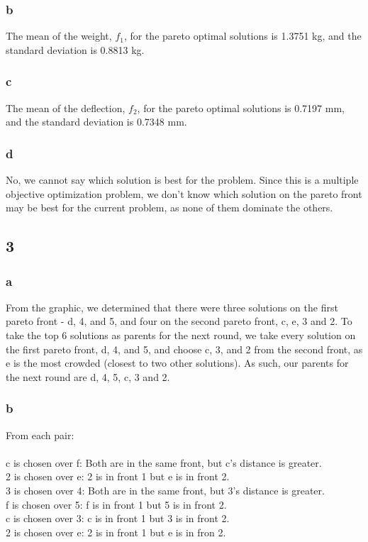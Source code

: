 \documentclass[12pt]{article}
\begin{document}
\subsubsection{b}
The mean of the weight, $f_1$, for the pareto optimal solutions is 1.3751 kg, and the standard deviation is 0.8813 kg.

\subsubsection{c}
The mean of the deflection, $f_2$, for the pareto optimal solutions is 0.7197 mm, and the standard deviation is 0.7348 mm.

\subsubsection{d}
No, we cannot say which solution is best for the problem. Since this is a multiple objective optimization problem, we don't know which solution on the pareto front may be best for the current problem, as none of them dominate the others.

\subsection{3}
\subsubsection{a}
From the graphic, we determined that there were three solutions on the first pareto front - d, 4, and 5, and four on the second pareto front, c, e, 3 and 2. To take the top 6 solutions as parents for the next round, we take every solution on the first pareto front, d, 4, and 5, and choose c, 3, and 2 from the second front, as e is the most crowded (closest to two other solutions). As such, our parents for the next round are d, 4, 5, c, 3 and 2.

\subsubsection{b}
From each pair:\\\\
c is chosen over f: Both are in the same front, but c's distance is greater.\\
2 is chosen over e: 2 is in front 1 but e is in front 2.\\
3 is chosen over 4: Both are in the same front, but 3's distance is greater.\\
f is chosen over 5: f is in front 1 but 5 is in front 2.\\
c is chosen over 3: c is in front 1 but 3 is in front 2.\\
2 is chosen over e: 2 is in front 1 but e is in fron 2. \\
\end{document}
